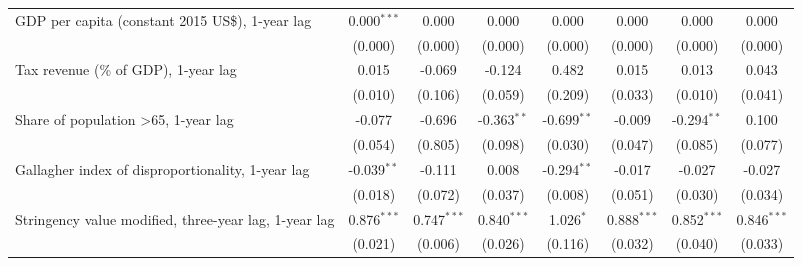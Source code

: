 \begin{table}[htbp]
\begin{tabular}{lccccccc}
      GDP per capita (constant 2015 US\$), 1-year lag                                         & 0.000$^{***}$ & 0.000                     & 0.000           & 0.000            & 0.000           & 0.000           & 0.000\\   
                                                                                              & (0.000)       & (0.000)                   & (0.000)         & (0.000)          & (0.000)         & (0.000)         & (0.000)\\   
      Tax revenue (\% of GDP), 1-year lag                                                     & 0.015         & -0.069                    & -0.124          & 0.482            & 0.015           & 0.013           & 0.043\\   
                                                                                              & (0.010)       & (0.106)                   & (0.059)         & (0.209)          & (0.033)         & (0.010)         & (0.041)\\   
      Share of population >65, 1-year lag                                                     & -0.077        & -0.696                    & -0.363$^{**}$   & -0.699$^{**}$    & -0.009          & -0.294$^{**}$   & 0.100\\   
                                                                                              & (0.054)       & (0.805)                   & (0.098)         & (0.030)          & (0.047)         & (0.085)         & (0.077)\\   
      Gallagher index of disproportionality, 1-year lag                                       & -0.039$^{**}$ & -0.111                    & 0.008           & -0.294$^{**}$    & -0.017          & -0.027          & -0.027\\   
                                                                                              & (0.018)       & (0.072)                   & (0.037)         & (0.008)          & (0.051)         & (0.030)         & (0.034)\\   
      Stringency value modified, three-year lag, 1-year lag                                   & 0.876$^{***}$ & 0.747$^{***}$             & 0.840$^{***}$   & 1.026$^{*}$      & 0.888$^{***}$   & 0.852$^{***}$   & 0.846$^{***}$\\   
                                                                                              & (0.021)       & (0.006)                   & (0.026)         & (0.116)          & (0.032)         & (0.040)         & (0.033)\\   

\end{tabular}
\end{table}
